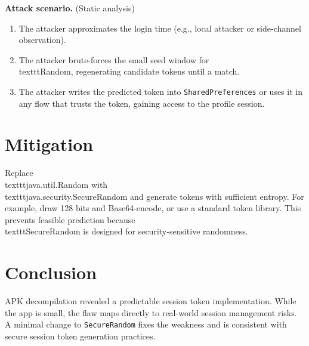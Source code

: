 ﻿\documentclass[letterpaper,twocolumn,10pt]{article}
\begin{document}
\textbf{Attack scenario.} (Static analysis)
\begin{enumerate}
\item The attacker approximates the login time (e.g., local attacker or side-channel observation).
\item The attacker brute-forces the small seed window for \\texttt{Random}, regenerating candidate tokens until a match.
\item The attacker writes the predicted token into \texttt{SharedPreferences} or uses it in any flow that trusts the token, gaining access to the profile session.
\end{enumerate}

\section{Mitigation}
Replace \\texttt{java.util.Random} with \\texttt{java.security.SecureRandom} and generate tokens with sufficient entropy. For example, draw 128 bits and Base64-encode, or use a standard token library. This prevents feasible prediction because \\texttt{SecureRandom} is designed for security-sensitive randomness.

\section{Conclusion}
APK decompilation revealed a predictable session token implementation. While the app is small, the flaw maps directly to real-world session management risks. A minimal change to \texttt{SecureRandom} fixes the weakness and is consistent with secure session token generation practices.
\end{document}
